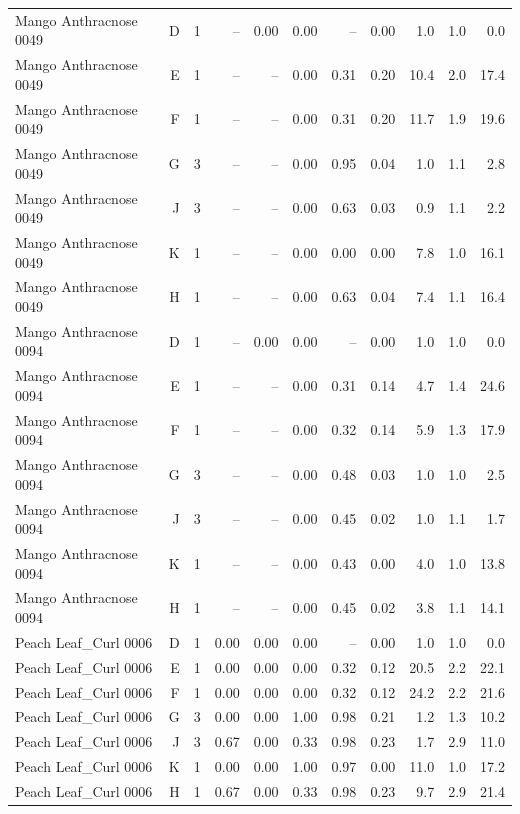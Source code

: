 \begin{table}[H]
{\begin{tabular}{lrrrrrrrrrr}
Mango Anthracnose 0049 & D & 1 & -- & 0.00 & 0.00 & -- & 0.00 & 1.0 & 1.0 & 0.0 \\
Mango Anthracnose 0049 & E & 1 & -- & -- & 0.00 & 0.31 & 0.20 & 10.4 & 2.0 & 17.4 \\
Mango Anthracnose 0049 & F & 1 & -- & -- & 0.00 & 0.31 & 0.20 & 11.7 & 1.9 & 19.6 \\
Mango Anthracnose 0049 & G & 3 & -- & -- & 0.00 & 0.95 & 0.04 & 1.0 & 1.1 & 2.8 \\
Mango Anthracnose 0049 & J & 3 & -- & -- & 0.00 & 0.63 & 0.03 & 0.9 & 1.1 & 2.2 \\
Mango Anthracnose 0049 & K & 1 & -- & -- & 0.00 & 0.00 & 0.00 & 7.8 & 1.0 & 16.1 \\
Mango Anthracnose 0049 & H & 1 & -- & -- & 0.00 & 0.63 & 0.04 & 7.4 & 1.1 & 16.4 \\
Mango Anthracnose 0094 & D & 1 & -- & 0.00 & 0.00 & -- & 0.00 & 1.0 & 1.0 & 0.0 \\
Mango Anthracnose 0094 & E & 1 & -- & -- & 0.00 & 0.31 & 0.14 & 4.7 & 1.4 & 24.6 \\
Mango Anthracnose 0094 & F & 1 & -- & -- & 0.00 & 0.32 & 0.14 & 5.9 & 1.3 & 17.9 \\
Mango Anthracnose 0094 & G & 3 & -- & -- & 0.00 & 0.48 & 0.03 & 1.0 & 1.0 & 2.5 \\
Mango Anthracnose 0094 & J & 3 & -- & -- & 0.00 & 0.45 & 0.02 & 1.0 & 1.1 & 1.7 \\
Mango Anthracnose 0094 & K & 1 & -- & -- & 0.00 & 0.43 & 0.00 & 4.0 & 1.0 & 13.8 \\
Mango Anthracnose 0094 & H & 1 & -- & -- & 0.00 & 0.45 & 0.02 & 3.8 & 1.1 & 14.1 \\
Peach Leaf\_Curl 0006 & D & 1 & 0.00 & 0.00 & 0.00 & -- & 0.00 & 1.0 & 1.0 & 0.0 \\
Peach Leaf\_Curl 0006 & E & 1 & 0.00 & 0.00 & 0.00 & 0.32 & 0.12 & 20.5 & 2.2 & 22.1 \\
Peach Leaf\_Curl 0006 & F & 1 & 0.00 & 0.00 & 0.00 & 0.32 & 0.12 & 24.2 & 2.2 & 21.6 \\
Peach Leaf\_Curl 0006 & G & 3 & 0.00 & 0.00 & 1.00 & 0.98 & 0.21 & 1.2 & 1.3 & 10.2 \\
Peach Leaf\_Curl 0006 & J & 3 & 0.67 & 0.00 & 0.33 & 0.98 & 0.23 & 1.7 & 2.9 & 11.0 \\
Peach Leaf\_Curl 0006 & K & 1 & 0.00 & 0.00 & 1.00 & 0.97 & 0.00 & 11.0 & 1.0 & 17.2 \\
Peach Leaf\_Curl 0006 & H & 1 & 0.67 & 0.00 & 0.33 & 0.98 & 0.23 & 9.7 & 2.9 & 21.4 \\

\end{tabular}}
\end{table}
